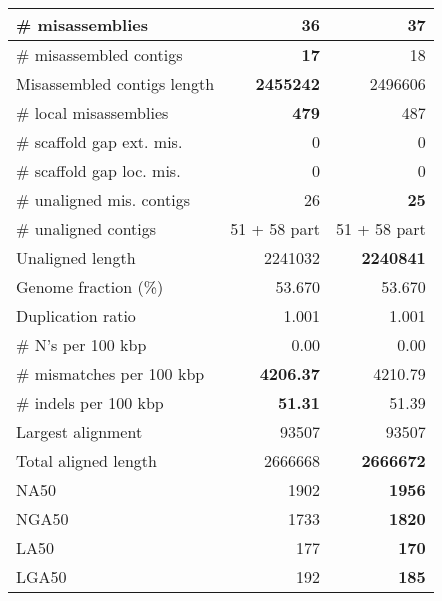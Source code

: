\documentclass[12pt,a4paper]{article}
\begin{document}
\begin{table}[ht]
\begin{center}
\begin{tabular}{|l*{2}{|r}|}
\# misassemblies & {\bf 36} & 37 \\ \hline
\# misassembled contigs & {\bf 17} & 18 \\ \hline
Misassembled contigs length & {\bf 2455242} & 2496606 \\ \hline
\# local misassemblies & {\bf 479} & 487 \\ \hline
\# scaffold gap ext. mis. & 0 & 0 \\ \hline
\# scaffold gap loc. mis. & 0 & 0 \\ \hline
\# unaligned mis. contigs & 26 & {\bf 25} \\ \hline
\# unaligned contigs & 51 + 58 part & 51 + 58 part \\ \hline
Unaligned length & 2241032 & {\bf 2240841} \\ \hline
Genome fraction (\%) & 53.670 & 53.670 \\ \hline
Duplication ratio & 1.001 & 1.001 \\ \hline
\# N's per 100 kbp & 0.00 & 0.00 \\ \hline
\# mismatches per 100 kbp & {\bf 4206.37} & 4210.79 \\ \hline
\# indels per 100 kbp & {\bf 51.31} & 51.39 \\ \hline
Largest alignment & 93507 & 93507 \\ \hline
Total aligned length & 2666668 & {\bf 2666672} \\ \hline
NA50 & 1902 & {\bf 1956} \\ \hline
NGA50 & 1733 & {\bf 1820} \\ \hline
LA50 & 177 & {\bf 170} \\ \hline
LGA50 & 192 & {\bf 185} \\ \hline
\end{tabular}
\end{center}
\end{table}
\end{document}
